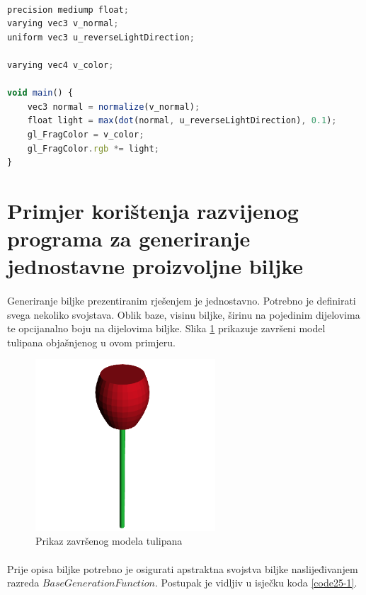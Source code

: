 \documentclass[times, utf8, diplomski]{fer}
\begin{document}
\paragraph{}
\begin{lstlisting}[language=Javascript,caption=Program za sjenčanje slikovnih elemenata,label=code24-5]
precision mediump float;
varying vec3 v_normal;
uniform vec3 u_reverseLightDirection;

varying vec4 v_color;

void main() {
    vec3 normal = normalize(v_normal);
    float light = max(dot(normal, u_reverseLightDirection), 0.1);
    gl_FragColor = v_color;
    gl_FragColor.rgb *= light;
}
\end{lstlisting}


\section{Primjer korištenja razvijenog programa za generiranje jednostavne proizvoljne biljke} \label{usage_tutorial}
\paragraph{}
Generiranje biljke prezentiranim rješenjem je jednostavno. Potrebno je definirati svega 
nekoliko svojstava. Oblik baze, visinu biljke, širinu na pojedinim dijelovima te opcijanalno 
boju na dijelovima biljke. Slika \ref{fig:25-1} prikazuje završeni model tulipana 
objašnjenog u ovom primjeru.

\begin{figure}[h]
	\centering
	\includegraphics[width=0.6\textwidth]{img/25-1}
	\caption{Prikaz završenog modela tulipana}
	\label{fig:25-1}
\end{figure}

\paragraph{}
Prije opisa biljke potrebno je osigurati apstraktna svojstva biljke naslijeđivanjem razreda
$BaseGenerationFunction$. Postupak je vidljiv u isječku koda \ref{code25-1}.
\end{document}
